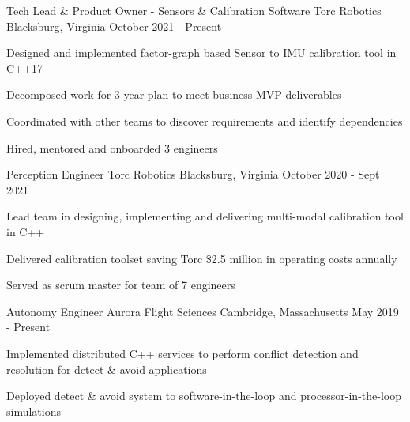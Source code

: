 

\begin{cventries}
  \cventry
    {Tech Lead \& Product Owner - Sensors \& Calibration Software} %
    {Torc Robotics} %
    {Blacksburg, Virginia} %
    {October 2021 - Present} %
    {
      \begin{cvitems}
      \item{Designed and implemented factor-graph based Sensor to IMU calibration tool in C++17}
      \item{Decomposed work for 3 year plan to meet business MVP deliverables}
      \item{Coordinated with other teams to discover requirements and identify dependencies}
      \item{Hired, mentored and onboarded 3 engineers}
      \end{cvitems}
    }
  \cventry
    {Perception Engineer} %
    {Torc Robotics} %
    {Blacksburg, Virginia} %
    {October 2020 - Sept 2021} %
    {
      \begin{cvitems}
      \item{Lead team in designing, implementing and delivering multi-modal calibration tool in C++}
      \item{Delivered calibration toolset saving Torc \$2.5 million in operating costs annually}
      \item{Served as scrum master for team of 7 engineers}
      \end{cvitems}
    }

  \cventry
    {Autonomy Engineer} %
    {Aurora Flight Sciences} %
    {Cambridge, Massachusetts} %
    {May 2019 - Present} %
    {
      \begin{cvitems}
      \item{Implemented distributed C++ services to perform conflict detection and resolution for detect \& avoid applications}
      \item{Deployed detect \& avoid system to software-in-the-loop and processor-in-the-loop simulations}
      \end{cvitems}
    }


\end{cventries}
